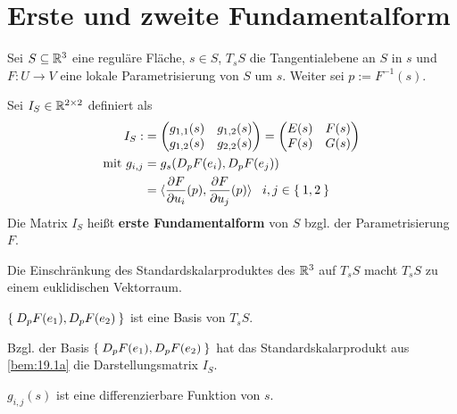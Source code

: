 \section{Erste und zweite Fundamentalform}%
Sei $S \subseteq \mathbb{R}^3$ eine reguläre Fläche, $s \in S$, $T_s S$ die Tangentialebene
an $S$ in $s$ und $F: U \rightarrow V$ eine lokale Parametrisierung von $S$ um
$s$. Weiter sei $p := F^{-1}(s)$.

\begin{definition}%
  Sei $I_S \in \mathbb{R}^{2 \times 2}$ definiert als
      \begin{align*}
        I_S :&= \begin{pmatrix}
                  g_{1,1}(s) & g_{1,2}(s)\\
                  g_{1,2}(s) & g_{2,2}(s)
               \end{pmatrix} =
               \begin{pmatrix}
                  E(s) & F(s) \\
                  F(s) & G(s)
               \end{pmatrix}\\
\text{mit } g_{i,j} &= g_s(D_p F(e_i), D_p F(e_j))\\
              &= \langle \frac{\partial F}{\partial u_i} (p), \frac{\partial F}{\partial u_j} (p) \rangle \;\;\; i,j \in \Set{1,2}
      \end{align*}
      Die Matrix $I_S$ heißt \textbf{erste Fundamentalform}
      von $S$ bzgl. der Parametrisierung $F$.
\end{definition}

\begin{bemerkung}%
    \begin{bemenum}
        \item \label{bem:19.1a} Die Einschränkung des Standardskalarproduktes des $\mathbb{R}^3$ auf
              $T_s S$ macht $T_s S$ zu einem euklidischen Vektorraum.
        \item $\Set{D_p F(e_1), D_p F(e_2)}$ ist eine Basis von $T_s S$.
        \item Bzgl. der Basis $\Set{D_p F(e_1), D_p F(e_2)}$ hat das
              Standardskalarprodukt aus \cref{bem:19.1a} die Darstellungsmatrix
              $I_S$.
        \item $g_{i,j}(s)$ ist eine differenzierbare Funktion von $s$.
    \end{bemenum}
\end{bemerkung}

